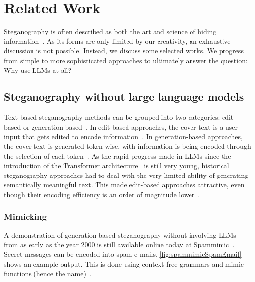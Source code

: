 
\chapter{Related Work}\label{ch:relatedwork}
\glsresetall %

Steganography is often described as both the art and science of hiding information~\cite{bennettLinguisticSteganographySurvey2004}. As its forms are only limited by our creativity, an exhaustive discussion is not possible. Instead, we discuss some selected works. We progress from simple to more sophisticated approaches to ultimately answer the question: Why use \glspl{LLM} at all?

\section{Steganography without large language models}
\label{sec:steganographyWithoutLLMs}
Text-based steganography methods can be grouped into two categories: edit-based or generation-based~\cite{zieglerNeuralLinguisticSteganography2019,bennettLinguisticSteganographySurvey2004}. In edit-based approaches, the cover text is a user input that gets edited to encode information~\cite{zieglerNeuralLinguisticSteganography2019}. In generation-based approaches, the cover text is generated token-wise, with information is being encoded through the selection of each token~\cite{zieglerNeuralLinguisticSteganography2019}. As the rapid progress made in \glspl{LLM} since the introduction of the Transformer architecture~\cite{vaswaniAttentionAllYou2023} is still very young, historical steganography approaches had to deal with the very limited ability of generating semantically meaningful text. This made edit-based approaches attractive, even though their encoding efficiency is an order of magnitude lower~\cite{zieglerNeuralLinguisticSteganography2019}.

\subsection{Mimicking}
\label{sec:mimicking}
A demonstration of generation-based steganography without involving \glspl{LLM} from as early as the year 2000 is still available online today at Spammimic~\cite{spammimicSpammimic2000,dembartEndUserHide2001,bennettLinguisticSteganographySurvey2004}. Secret messages can be encoded into spam e-mails. \cref{fig:spammimicSpamEmail} shows an example output. This is done using context-free grammars and mimic functions (hence the name)~\cite{waynerMimicFunctions1992,bennettLinguisticSteganographySurvey2004}.

